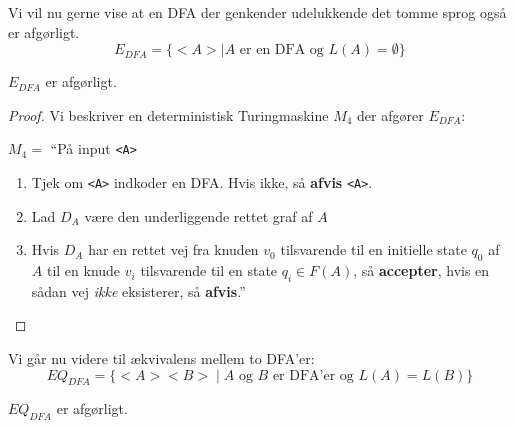 Vi vil nu gerne vise at en DFA der genkender udelukkende det tomme sprog også er afgørligt.
\begin{equation*}
E_{DFA} = \{<A> \mid A \text{ er en DFA og } L(A) = \emptyset\}
\end{equation*}

\begin{theorem}
$E_{DFA}$ er afgørligt.
\end{theorem}

\begin{proof}
  Vi beskriver en deterministisk Turingmaskine $M_{4}$ der afgører $E_{DFA}$:

  $M_{4} = $ ``På input \texttt{<A>}
  \begin{enumerate}
    \item Tjek om \texttt{<A>} indkoder en DFA. Hvis ikke, så \textbf{afvis} \texttt{<A>}.
    \item Lad $D_{A}$ være den underliggende rettet graf af $A$
    \item Hvis $D_{A}$ har en rettet vej fra knuden $v_{0}$  tilsvarende til en initielle state $q_{0}$ af $A$ til en knude $v_{i}$ tilsvarende til en state $q_{i} \in F(A)$, så \textbf{accepter}, hvis en sådan vej \textit{ikke} eksisterer, så \textbf{afvis}.''
  \end{enumerate}
\end{proof}

Vi går nu videre til ækvivalens mellem to DFA'er:
\begin{equation*}
EQ_{DFA} = \{{<A><B>} \mid A \text{ og } B \text{ er DFA'er og } L(A) = L(B)\}
\end{equation*}

\begin{theorem}
$EQ_{DFA}$ er afgørligt.
\end{theorem}

